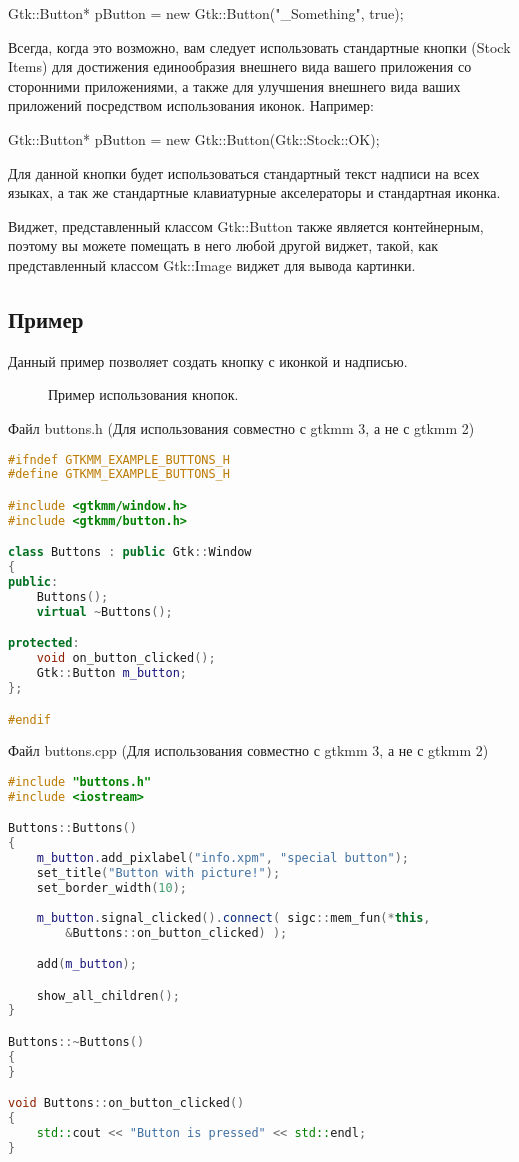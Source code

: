 Gtk::Button* pButton = new Gtk::Button("\_Something", true);

Всегда, когда это возможно, вам следует использовать стандартные кнопки (Stock Items) для достижения единообразия внешнего вида вашего приложения со сторонними приложениями, а также для улучшения внешнего вида ваших приложений посредством использования иконок. Например:

Gtk::Button* pButton = new Gtk::Button(Gtk::Stock::OK);

Для данной кнопки будет использоваться стандартный текст надписи на всех языках, а так же стандартные клавиатурные акселераторы и стандартная иконка.

Виджет, представленный классом Gtk::Button также является контейнерным, поэтому вы можете помещать в него любой другой виджет, такой, как представленный классом Gtk::Image виджет для вывода картинки. 
\subsection{Пример}
Данный пример позволяет создать кнопку с иконкой и надписью. 
\begin{figure}[h]
	\center{\texttt{[image: 51]}}
	\caption{Пример использования кнопок.}
	\label{ris5:image}
\end{figure}
Файл buttons.h (Для использования совместно с gtkmm 3, а не с gtkmm 2) 
\begin{lstlisting}[language=C++]
#ifndef GTKMM_EXAMPLE_BUTTONS_H
#define GTKMM_EXAMPLE_BUTTONS_H

#include <gtkmm/window.h>
#include <gtkmm/button.h>

class Buttons : public Gtk::Window
{
public:
	Buttons();
	virtual ~Buttons();

protected:
	void on_button_clicked();
	Gtk::Button m_button;
};

#endif

\end{lstlisting}
Файл buttons.cpp (Для использования совместно с gtkmm 3, а не с gtkmm 2) 
\begin{lstlisting}[language=C++]
#include "buttons.h"
#include <iostream>

Buttons::Buttons()
{
	m_button.add_pixlabel("info.xpm", "special button");
	set_title("Button with picture!");
	set_border_width(10);
	
	m_button.signal_clicked().connect( sigc::mem_fun(*this,
		&Buttons::on_button_clicked) );

	add(m_button);

	show_all_children();
}

Buttons::~Buttons()
{
}

void Buttons::on_button_clicked()
{
	std::cout << "Button is pressed" << std::endl;
}
\end{lstlisting}

